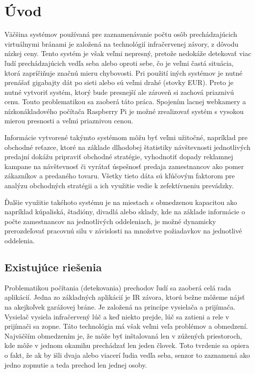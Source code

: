 
\chapter{Úvod}
Väčšina systémov používaná pre zaznamenávanie počtu osôb prechádzajúcich virtuálnymi bránami  je založená na technológií infračervenej závory, z dôvodu nízkej ceny. Tento systém je však veľmi nepresný, pretože nedokáže detekovať viac ľudí prechádzajúcich vedľa seba alebo oproti sebe, čo je veľmi častá situácia, ktorá zapríčiňuje značnú mieru chybovosti. Pri použití iných systémov je nutné prenášať gigabajty dát po sieti alebo sú veľmi drahé (stovky EUR). Preto je nutné vytvoriť systém, ktorý bude presnejší ale zároveň si zachová priaznivú cenu. Touto problematikou sa zaoberá táto práca. Spojením lacnej webkamery a nízkonákladového počítača Raspberry Pi je možné zrealizovať systém s vysokou mierou presnosti a veľmi priaznivou cenou.
    
Informácie vytvorené takýmto systémom môžu byť veľmi užitočné, napríklad pre obchodné reťazce, ktoré na základe dlhodobej štatistiky návštevnosti jednotlivých predajní dokážu pripraviť obchodné stratégie, vyhodnotiť dopady reklamnej kampane na návštevnosť či vyrátať úspešnosť predaja zamestnancov ako pomer zákazníkov a predaného tovaru. Všetky tieto dáta sú kľúčovým faktorom pre analýzu obchodných stratégii a ich využitie vedie k zefektívneniu prevádzky.
    
Ďalšie využitie takéhoto systému je na miestach s obmedzenou kapacitou ako napríklad kúpaliská, štadióny, divadlá alebo sklady, kde na základe informácie o počte zamestnancov na jednotlivých oddeleniach, je možné dynamicky prerozdeľovať pracovnú silu v závislosti na množstve požiadavkov na jednotlivé oddelenia. 



\section{Existujúce riešenia}
Problematikou počítania (detekovania) prechodov ľudí sa zaoberá celá rada aplikácií.  
Jedna zo základných aplikácií je IR závora, ktorú bežne môžeme nájsť na akejkoľvek garážovej bráne. Je založená na princípe vysielača a prijímača. Vysielač vysiela infračervený lúč a keď niekto prejde, lúč sa zatieni a rele v prijímači sa zopne. Táto technológia má však veľmi veľa problémov a obmedzení. Najväčším obmedzením je, že môže byť inštalovaná len v zúžených priestoroch, kde môže v jednom okamihu prechádzať len jeden človek. Toto tvrdenie sa opiera o fakt, že ak by išli dvaja alebo viacerí ľudia vedľa seba, senzor to zaznamená ako jedno zopnutie a teda prechod len jednej osoby.

